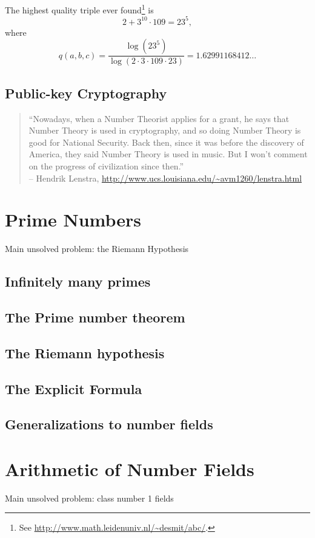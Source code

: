 \documentclass{book}
\theoremstyle{plain}
\theoremstyle{definition}
\numberwithin{equation}{section}
\numberwithin{figure}{section}
\numberwithin{table}{section}
\begin{document}
The highest quality triple ever found\footnote{See \url{http://www.math.leidenuniv.nl/~desmit/abc/}.} is
$$
   2 + 3^{10}\cdot 109 = 23^5,
$$
where
$$
q(a,b,c) = \frac{\log(23^5)}{\log(2\cdot 3 \cdot 109 \cdot 23)}
    = 1.62991168412\ldots
$$


\section{Public-key Cryptography}


\begin{quote}
``Nowadays, when a Number Theorist applies for a grant, he says
that Number Theory is used in cryptography, and so doing Number
Theory is good for National Security. Back then, since it was
before the discovery of America, they said Number Theory is
used in music. But I won't comment on the progress of
civilization since then.''\\-- Hendrik Lenstra, \url{http://www.ucs.louisiana.edu/~avm1260/lenstra.html}
\end{quote}



\chapter{Prime Numbers}

Main unsolved problem: the Riemann Hypothesis



\section{Infinitely many primes}
\section{The Prime number theorem}
\section{The Riemann hypothesis}
\section{The Explicit Formula}
\section{Generalizations to number fields}


\chapter{Arithmetic of Number Fields}
Main unsolved problem: class number 1 fields
\end{document}
